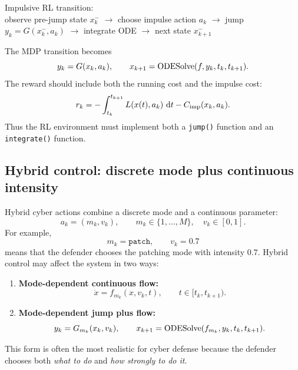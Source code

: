 \documentclass[11pt,a4paper]{article}
\begin{document}
\begin{flowbox}
Impulsive RL transition:\\[0.3em]
observe pre-jump state $x_k^-$ $\rightarrow$ choose impulse action $a_k$ $\rightarrow$ jump $y_k=G(x_k^-,a_k)$ $\rightarrow$ integrate ODE $\rightarrow$ next state $x_{k+1}^-$
\end{flowbox}

The MDP transition becomes
\begin{equation}
    y_k=G(x_k,a_k),\qquad x_{k+1}=\operatorname{ODESolve}(f,y_k,t_k,t_{k+1}).
\end{equation}
The reward should include both the running cost and the impulse cost:
\begin{equation}
    r_k=-\int_{t_k}^{t_{k+1}}L(x(t),a_k)\,\,\mathrm{d} t-C_{\rm imp}(x_k,a_k).
\end{equation}
Thus the RL environment must implement both a \texttt{jump()} function and an \texttt{integrate()} function.

\subsection{Hybrid control: discrete mode plus continuous intensity}
Hybrid cyber actions combine a discrete mode and a continuous parameter:
\begin{equation}
    a_k=(m_k,v_k),\qquad m_k\in\{1,\ldots,M\},\quad v_k\in[0,1].
\end{equation}
For example,
\begin{equation}
    m_k=\texttt{patch},\qquad v_k=0.7
\end{equation}
means that the defender chooses the patching mode with intensity $0.7$. Hybrid control may affect the system in two ways:
\begin{enumerate}
\item \textbf{Mode-dependent continuous flow:}
\begin{equation}
    \dot{x}=f_{m_k}(x,v_k,t),\qquad t\in[t_k,t_{k+1}).
\end{equation}
\item \textbf{Mode-dependent jump plus flow:}
\begin{equation}
    y_k=G_{m_k}(x_k,v_k),\qquad x_{k+1}=\operatorname{ODESolve}(f_{m_k},y_k,t_k,t_{k+1}).
\end{equation}
\end{enumerate}
This form is often the most realistic for cyber defense because the defender chooses both \emph{what to do} and \emph{how strongly to do it}.
\end{document}
